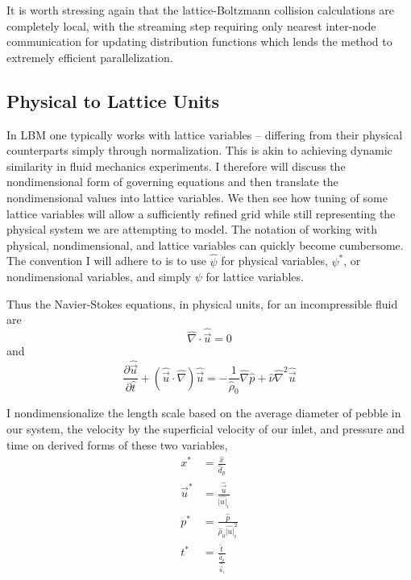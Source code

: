 It is worth stressing again that the lattice-Boltzmann collision calculations are completely local, with the streaming step requiring only nearest inter-node communication for updating distribution functions which lends the method to extremely efficient parallelization. 






\subsection{Physical to Lattice Units}\label{sec:physical-to-lattice}
In LBM one typically works with lattice variables -- differing from their physical counterparts simply through normalization. This is akin to achieving dynamic similarity in fluid mechanics experiments. I therefore will discuss the nondimensional form of governing equations and then translate the nondimensional values into lattice variables. We then see how tuning of some lattice variables will allow a sufficiently refined grid while still representing the physical system we are attempting to model. The notation of working with physical, nondimensional, and lattice variables can quickly become cumbersome. The convention I will adhere to is to use $\hat{\psi}$ for physical variables, $\psi^*$, or nondimensional variables, and simply $\psi$ for lattice variables.

Thus the Navier-Stokes equations, in physical units, for an incompressible fluid are
\begin{equation}
	\hat{\nabla}\cdot\hat{\vec{u}} = 0
\end{equation}
and
\begin{equation}
	\frac{\partial \hat{\vec{u}}}{\partial \hat{t}} + (\hat{\vec{u}}\cdot\hat{\nabla})\hat{\vec{u}} = -\frac{1}{\hat{\rho}_0}\hat{\nabla}\hat{p} + \hat{\nu}\hat{\nabla}^2\hat{\vec{u}}
\end{equation}

I nondimensionalize the length scale based on the average diameter of pebble in our system, the velocity by the superficial velocity of our inlet, and pressure and time on derived forms of these two variables,
\begin{subequations}
\begin{align}
	x^* &= \frac{\hat{x}}{\hat{d}_p} \\
	\vec{u}^* &= \frac{\hat{\vec{u}}}{\hat{|u|}_i} \\
	p^* &= \frac{\hat{p}}{\hat{\rho}_0\hat{|u|}_i^2}\\
	t^* &= \frac{\hat{t}}{\frac{\hat{d}_p}{\hat{\vec{u}}_i}}
\end{align}
\end{subequations}

